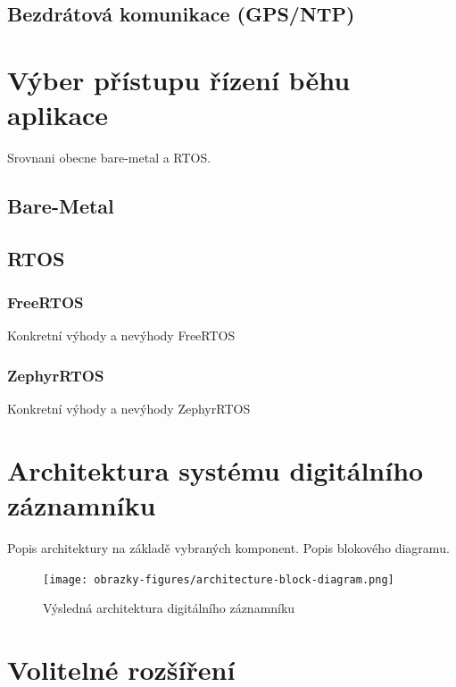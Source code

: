 \subsection{Bezdrátová komunikace (GPS/NTP)}

\section{Výber přístupu řízení běhu aplikace}
Srovnani obecne bare-metal a RTOS.


\subsection{Bare-Metal}

\subsection{RTOS}
\subsubsection{FreeRTOS}
Konkretní výhody a nevýhody FreeRTOS

\subsubsection{ZephyrRTOS}
Konkretní výhody a nevýhody ZephyrRTOS


\section{Architektura systému digitálního záznamníku}
Popis architektury na základě vybraných komponent. Popis blokového diagramu.

\begin{figure}[h]
    \centering
    \texttt{[image: obrazky-figures/architecture-block-diagram.png]}
    
    \caption{Výsledná architektura digitálního záznamníku}
    \label{fig:low-power-modes}
\end{figure}


\section{Volitelné rozšíření}
